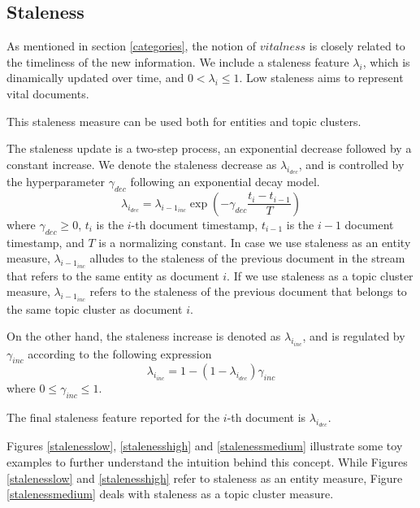 \documentclass{article}
\begin{document}

\subsection{Staleness}
\label{staleness}

As mentioned in section \ref{categories}, the notion of $vitalness$ is closely related to the timeliness of the new information. We include a staleness feature $\lambda_i$, which is dinamically updated over time, and $0 < \lambda_i \leq 1$. Low staleness aims to represent vital documents.

This staleness measure can be used both for entities and topic clusters.

The staleness update is a two-step process, an exponential decrease followed by a constant increase.
We denote the staleness decrease as $\lambda_{i_{dec}}$, and is controlled by the hyperparameter $\gamma_{dec}$ following an exponential decay model.
\begin{equation}
\label{decrease}
\lambda_{i_{dec}} = \lambda_{{i-1}_{inc}} \exp{(-\gamma_{dec} \frac{t_i-t_{i-1}}{T})}
\end{equation}
where $\gamma_{dec} \geq 0$, $t_i$ is the $i$-th document timestamp, $t_{i-1}$ is the $i-1$ document timestamp, and $T$ is a normalizing constant.
In case we use staleness as an entity measure, $\lambda_{{i-1}_{inc}}$ alludes to the staleness of the previous document in the stream that refers to the same entity as document $i$.
If we use staleness as a topic cluster measure, $\lambda_{{i-1}_{inc}}$ refers to the staleness of the previous document that belongs to the same topic cluster as document $i$.

On the other hand, the staleness increase is denoted as $\lambda_{i_{inc}}$, and is regulated by $\gamma_{inc}$ according to the following expression
\begin{equation}
\lambda_{i_{inc}} = 1 - (1 - \lambda_{i_{dec}}) \gamma_{inc}
\end{equation}
where $0 \leq \gamma_{inc} \leq 1$.

The final staleness feature reported for the $i$-th document is $\lambda_{i_{dec}}$.

Figures \ref{stalenesslow}, \ref{stalenesshigh} and \ref{stalenessmedium} illustrate some toy examples to further understand the intuition behind this concept. While Figures \ref{stalenesslow} and \ref{stalenesshigh} refer to staleness as an entity measure, Figure \ref{stalenessmedium} deals with staleness as a topic cluster measure.
\end{document}
